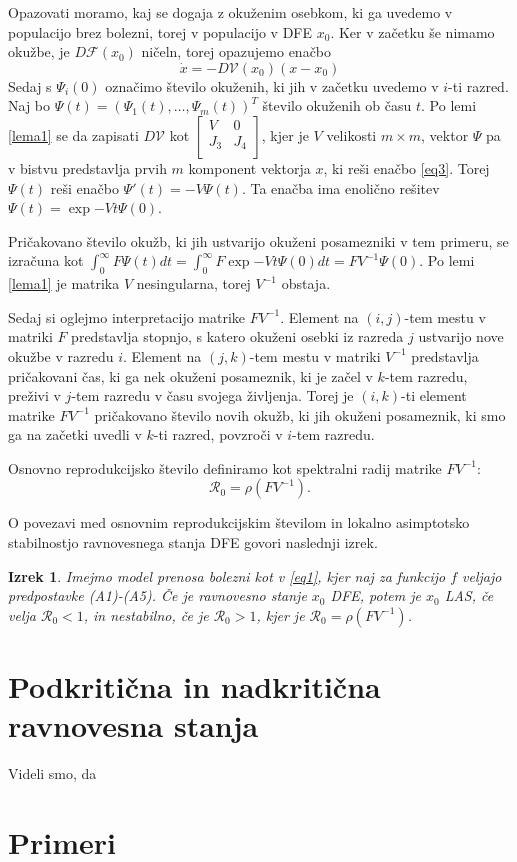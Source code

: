\documentclass[a4paper,12pt]{article}
\newcommand{\todo}[1]{{\color{red}{#1}}}
\newcommand{\R}{\mathcal R}
\newcommand{\F}{\mathcal F}
\newcommand{\V}{\mathcal V}
\newtheorem{izrek}{Izrek}
\begin{document}
Opazovati moramo, kaj se dogaja z okuženim osebkom, ki ga uvedemo v populacijo brez 
bolezni, torej v populacijo v DFE \(x_0\). Ker v začetku še nimamo okužbe, je 
\(D\F(x_0)\) ničeln, torej opazujemo enačbo
\begin{equation}\label{eq3}
    \dot{x}=-D\V(x_0)(x-x_0)
\end{equation}
Sedaj s \(\Psi_i(0)\) označimo število okuženih, ki jih v začetku uvedemo v \(i\)-ti 
razred. Naj bo \(\Psi(t)=(\Psi_1(t),\ldots,\Psi_m(t))^T\) število okuženih ob času \(t\). 
Po lemi \ref{lema1} se da zapisati \(D\V\) kot 
\(
\begin{bmatrix}
    V & 0 \\
    J_3 & J_4 \\
\end{bmatrix}
\),
kjer je \(V\) velikosti \(m \times m\), vektor \(\Psi\) pa v bistvu
predstavlja prvih \(m\) komponent vektorja \(x\), ki reši enačbo \ref{eq3}. Torej 
\(\Psi(t)\) reši enačbo \(\Psi'(t)=-V\Psi(t)\). Ta enačba ima enolično rešitev 
\(\Psi(t)=\exp{-Vt}\Psi(0)\).

Pričakovano število okužb, ki jih ustvarijo okuženi posamezniki v tem primeru,
se izračuna kot \(\int_0^\infty F\Psi(t)dt = \int_0^\infty F\exp{-Vt}\Psi(0)dt = FV^{-1}\Psi(0)\).
Po lemi \ref{lema1} je matrika \(V\) nesingularna, torej \(V^{-1}\) obstaja. 

Sedaj si oglejmo interpretacijo matrike \(FV^{-1}\). Element na \((i,j)\)-tem mestu
v matriki \(F\) predstavlja stopnjo, s katero okuženi osebki iz razreda \(j\)
ustvarijo nove okužbe v razredu \(i\). Element na \((j,k)\)-tem mestu v matriki \(V^{-1}\)
predstavlja pričakovani čas, ki ga nek okuženi posameznik, ki je začel v \(k\)-tem razredu, 
preživi v \(j\)-tem razredu v času svojega življenja. Torej je \((i,k)\)-ti element 
matrike \(FV^{-1}\) pričakovano število novih okužb, ki jih okuženi posameznik, ki 
smo ga na začetki uvedli v \(k\)-ti razred, povzroči v \(i\)-tem razredu.

Osnovno reprodukcijsko število definiramo kot spektralni radij matrike \(FV^{-1}\):
\[\R_0=\rho(FV^{-1}).\]

O povezavi med osnovnim reprodukcijskim številom in lokalno asimptotsko stabilnostjo 
ravnovesnega stanja DFE govori naslednji izrek.

\begin{izrek}
    Imejmo model prenosa bolezni kot v \ref{eq1}, kjer naj za funkcijo \(f\) veljajo
    predpostavke (A1)-(A5). Če je ravnovesno stanje \(x_0\) DFE, potem je \(x_0\) LAS, 
    če velja \(\R_0<1\), in nestabilno, če je \(\R_0>1\), kjer je \(\R_0=\rho(FV^{-1})\).
\end{izrek}

\todo{dokaz}

\section{Podkritična in nadkritična ravnovesna stanja}

Videli smo, da 

\section{Primeri}
\end{document}
